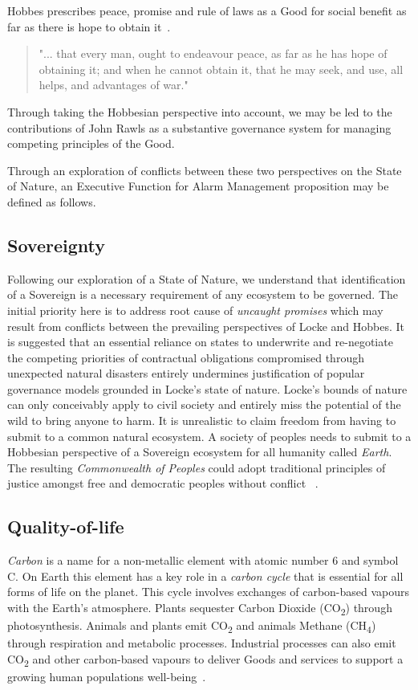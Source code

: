 \documentclass[11pt, oneside]{article}   	%
\begin{document}
Hobbes prescribes peace, promise and rule of laws as a Good for social benefit as far as there is hope to obtain it~\cite{th1}.

\pagebreak

\begin{quote}
"... that every man, ought to endeavour peace, as far as he has hope of obtaining it; and when he cannot obtain it, that he may seek, and use, all helps, and advantages of war."
\end{quote}
Through taking the Hobbesian perspective into account, we may be led to the contributions of John Rawls as a substantive governance system for managing competing principles of the Good.\

Through an exploration of conflicts between these two perspectives on the State of Nature, an Executive Function for Alarm Management proposition may be defined as follows.\

\subsection{Sovereignty}
Following our exploration of a State of Nature, we understand that identification of a Sovereign is a necessary requirement of any ecosystem to be governed.
The initial priority here is to address root cause of \emph{uncaught promises} which may result from conflicts between the prevailing perspectives of Locke and Hobbes.
It is suggested that an essential reliance on states to underwrite and re-negotiate the competing priorities of contractual obligations compromised through unexpected natural disasters entirely undermines justification of popular governance models grounded in Locke's state of nature.
Locke's bounds of nature can only conceivably apply to civil society and entirely miss the potential of the wild to bring anyone to harm.
It is unrealistic to claim freedom from having to submit to a common natural ecosystem.
A society of peoples needs to submit to a Hobbesian perspective of a Sovereign ecosystem for all humanity called \emph{Earth}.
The resulting \emph{Commonwealth of Peoples} could adopt traditional principles of justice amongst free and democratic peoples without conflict ~\cite{jr2}.\

\subsection{Quality-of-life}
\emph{Carbon} is a name for a non-metallic element with atomic number 6 and symbol C.
On Earth this element has a key role in a \emph{carbon cycle} that is essential for all forms of life on the planet.
This cycle involves exchanges of carbon-based vapours with the Earth's atmosphere.
Plants sequester Carbon Dioxide (CO\textsubscript{2}) through photosynthesis.
Animals and plants emit CO\textsubscript{2} and animals Methane (CH\textsubscript{4}) through respiration and metabolic processes.
Industrial processes can also emit CO\textsubscript{2} and other carbon-based vapours to deliver Goods and services to support a growing human populations well-being~\cite{ng1}.\
\end{document}
